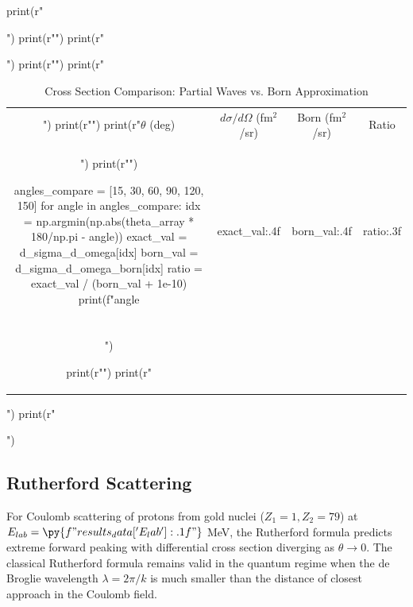 \documentclass[a4paper, 11pt]{article}
\begin{document}
\begin{pycode}
print(r"\begin{table}[htbp]")
print(r"\centering")
print(r"\caption{Cross Section Comparison: Partial Waves vs. Born Approximation}")
print(r"\label{tab:born_comparison}")
print(r"\begin{tabular}{cccc}")
print(r"\toprule")
print(r"$\theta$ (deg) & $d\sigma/d\Omega$ (fm$^2$/sr) & Born (fm$^2$/sr) & Ratio \\")
print(r"\midrule")

angles_compare = [15, 30, 60, 90, 120, 150]
for angle in angles_compare:
    idx = np.argmin(np.abs(theta_array * 180/np.pi - angle))
    exact_val = d_sigma_d_omega[idx]
    born_val = d_sigma_d_omega_born[idx]
    ratio = exact_val / (born_val + 1e-10)
    print(f"{angle} & {exact_val:.4f} & {born_val:.4f} & {ratio:.3f} \\\\")

print(r"\bottomrule")
print(r"\end{tabular}")
print(r"\end{table}")
\end{pycode}

\subsection{Rutherford Scattering}

For Coulomb scattering of protons from gold nuclei ($Z_1 = 1, Z_2 = 79$) at
$E_{lab} = \py{f"{results_data['E_lab']:.1f}"}$ MeV, the Rutherford formula predicts extreme
forward peaking with differential cross section diverging as $\theta \to 0$. The classical
Rutherford formula remains valid in the quantum regime when the de Broglie wavelength
$\lambda = 2\pi/k$ is much smaller than the distance of closest approach in the Coulomb field.
\end{document}

